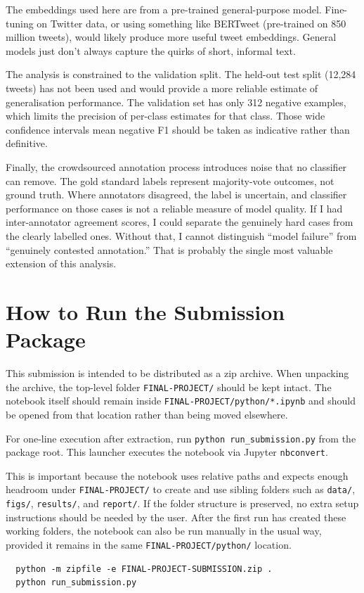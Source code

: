 \documentclass[12pt]{article}
\begin{document}
The embeddings used here are from a pre-trained general-purpose model. Fine-tuning on Twitter data, or using something like BERTweet (pre-trained on 850 million tweets), would likely produce more useful tweet embeddings. General models just don't always capture the quirks of short, informal text.

The analysis is constrained to the validation split. The held-out test split (12,284 tweets) has not been used and would provide a more reliable estimate of generalisation performance. The validation set has only 312 negative examples, which limits the precision of per-class estimates for that class. Those wide confidence intervals mean negative F1 should be taken as indicative rather than definitive.

Finally, the crowdsourced annotation process introduces noise that no classifier can remove. The gold standard labels represent majority-vote outcomes, not ground truth. Where annotators disagreed, the label is uncertain, and classifier performance on those cases is not a reliable measure of model quality. If I had inter-annotator agreement scores, I could separate the genuinely hard cases from the clearly labelled ones. Without that, I cannot distinguish ``model failure'' from ``genuinely contested annotation.'' That is probably the single most valuable extension of this analysis.



\nocite{*}





\appendix

\section{How to Run the Submission Package}

This submission is intended to be distributed as a zip archive.
When unpacking the archive, the top-level folder \texttt{FINAL-PROJECT/} should be kept intact.
The notebook itself should remain inside \texttt{FINAL-PROJECT/python/*.ipynb} and should be opened from that location rather than being moved elsewhere.

For one-line execution after extraction, run \texttt{python run\_submission.py} from the package root.
This launcher executes the notebook via Jupyter \texttt{nbconvert}.

This is important because the notebook uses relative paths and expects enough headroom under \texttt{FINAL-PROJECT/} to create and use sibling folders such as \texttt{data/}, \texttt{figs/}, \texttt{results/}, and \texttt{report/}.
If the folder structure is preserved, no extra setup instructions should be needed by the user.
After the first run has created these working folders, the notebook can also be run manually in the usual way, provided it remains in the same \texttt{FINAL-PROJECT/python/} location.

\begin{verbatim}
  python -m zipfile -e FINAL-PROJECT-SUBMISSION.zip .
  python run_submission.py
\end{verbatim}
\end{document}
